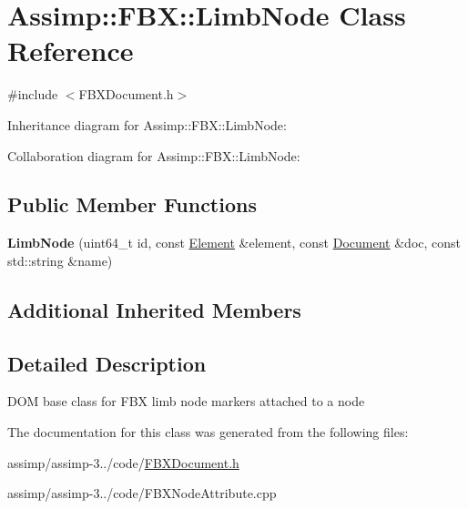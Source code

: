 \hypertarget{class_assimp_1_1_f_b_x_1_1_limb_node}{\section{Assimp\+:\+:F\+B\+X\+:\+:Limb\+Node Class Reference}
\label{class_assimp_1_1_f_b_x_1_1_limb_node}
}


{\ttfamily \#include $<$F\+B\+X\+Document.\+h$>$}



Inheritance diagram for Assimp\+:\+:F\+B\+X\+:\+:Limb\+Node\+:


Collaboration diagram for Assimp\+:\+:F\+B\+X\+:\+:Limb\+Node\+:
\subsection*{Public Member Functions}
\begin{DoxyCompactItemize}
\item 
\hypertarget{class_assimp_1_1_f_b_x_1_1_limb_node_a4bb60d74df280ce24d0b605120a33b0f}{{\bfseries Limb\+Node} (uint64\+\_\+t id, const \hyperlink{class_assimp_1_1_f_b_x_1_1_element}{Element} \&element, const \hyperlink{class_assimp_1_1_f_b_x_1_1_document}{Document} \&doc, const std\+::string \&name)}\label{class_assimp_1_1_f_b_x_1_1_limb_node_a4bb60d74df280ce24d0b605120a33b0f}

\end{DoxyCompactItemize}
\subsection*{Additional Inherited Members}


\subsection{Detailed Description}
D\+O\+M base class for F\+B\+X limb node markers attached to a node 

The documentation for this class was generated from the following files\+:\begin{DoxyCompactItemize}
\item 
assimp/assimp-\/3../code/\hyperlink{_f_b_x_document_8h}{F\+B\+X\+Document.\+h}\item 
assimp/assimp-\/3../code/F\+B\+X\+Node\+Attribute.\+cpp\end{DoxyCompactItemize}
